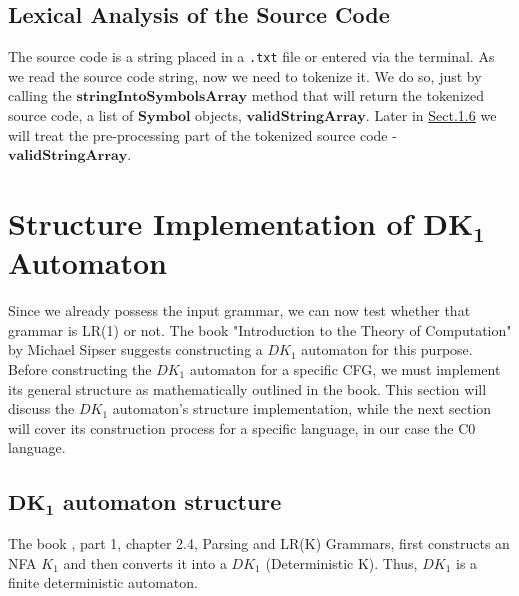 \vspace{30pt}

\subsection{Lexical Analysis of the Source Code}

The source code is a string placed in a \texttt{.txt} file or entered via the terminal. As we read the source code string, now we need to tokenize it. We do so, just by calling the \(\boldsymbol{stringIntoSymbolsArray}\) method that will return the tokenized source code, a list of \(\boldsymbol{Symbol}\) objects, \(\boldsymbol{validStringArray}\). Later in \hyperref[sec:Pre-processing for C0 Source Code]{Sect.1.6} we will treat the pre-processing part of the tokenized source code - \(\boldsymbol{validStringArray}\).

\newpage


\section{Structure Implementation of \(\boldsymbol{DK_{1}}\) Automaton}\label{sec:Structure Implementation of DK1 Automaton}

Since we already possess the input grammar, we can now test whether that grammar is LR(1) or not. The book "Introduction to the Theory of Computation" by Michael Sipser \cite{sipser} suggests constructing a \( DK_{1} \) automaton for this purpose. Before constructing the \( DK_{1} \) automaton for a specific CFG, we must implement its general structure as mathematically outlined in the book. This section will discuss the \( DK_{1} \) automaton’s structure implementation, while the next section will cover its construction process for a specific language, in our case the C0 language.

\vspace{15pt}

\subsection{\(\boldsymbol{DK_{1}}\) automaton structure}

The book \cite{sipser}, part 1, chapter 2.4, Parsing and LR(K) Grammars, first constructs an NFA \(K_{1}\) and then converts it into a \( DK_{1}\) (Deterministic K). Thus, \( DK_{1}\) is a finite deterministic automaton.

